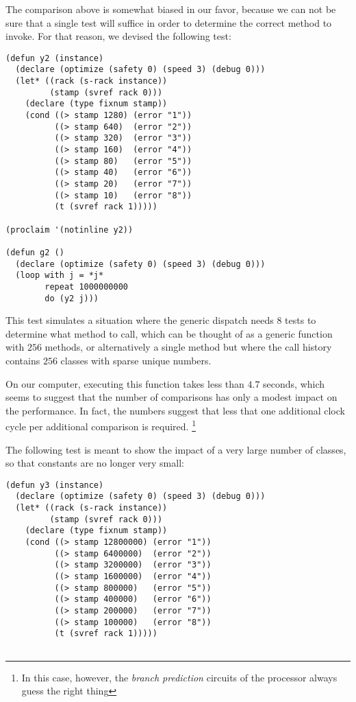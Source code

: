 {The comparison above is somewhat biased in our favor, because we can
not be sure that a single test will suffice in order to determine the
correct method to invoke.  For that reason, we devised the following
test: 

{\small\begin{verbatim}
(defun y2 (instance)
  (declare (optimize (safety 0) (speed 3) (debug 0)))
  (let* ((rack (s-rack instance))
         (stamp (svref rack 0)))
    (declare (type fixnum stamp))
    (cond ((> stamp 1280) (error "1"))
          ((> stamp 640)  (error "2"))
          ((> stamp 320)  (error "3"))
          ((> stamp 160)  (error "4"))
          ((> stamp 80)   (error "5"))
          ((> stamp 40)   (error "6"))
          ((> stamp 20)   (error "7"))
          ((> stamp 10)   (error "8"))
          (t (svref rack 1)))))

(proclaim '(notinline y2))

(defun g2 ()
  (declare (optimize (safety 0) (speed 3) (debug 0)))
  (loop with j = *j*
        repeat 1000000000
        do (y2 j)))
\end{verbatim}}

This test simulates a situation where the generic dispatch needs $8$
tests to determine what method to call, which can be thought of as a
generic function with $256$ methods, or alternatively a single method
but where the call history contains $256$ classes with sparse unique
numbers. 

On our computer, executing this function takes less than $4.7$ seconds,
which seems to suggest that the number of comparisons has only a
modest impact on the performance.  In fact, the numbers suggest that
less that one additional clock cycle per additional comparison is
required.%
\footnote{In this case, however, the \emph{branch prediction} circuits
  of the processor always guess the right thing}

The following test is meant to show the impact of a very large number
of classes, so that constants are no longer very small:

{\small\begin{verbatim}
(defun y3 (instance)
  (declare (optimize (safety 0) (speed 3) (debug 0)))
  (let* ((rack (s-rack instance))
         (stamp (svref rack 0)))
    (declare (type fixnum stamp))
    (cond ((> stamp 12800000) (error "1"))
          ((> stamp 6400000)  (error "2"))
          ((> stamp 3200000)  (error "3"))
          ((> stamp 1600000)  (error "4"))
          ((> stamp 800000)   (error "5"))
          ((> stamp 400000)   (error "6"))
          ((> stamp 200000)   (error "7"))
          ((> stamp 100000)   (error "8"))
          (t (svref rack 1)))))


\end{verbatim}}}
